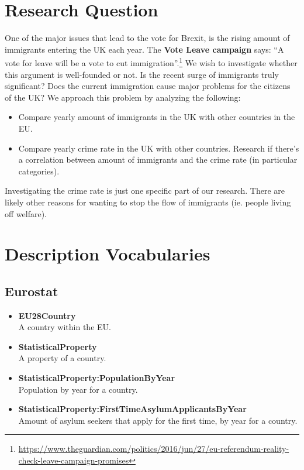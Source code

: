 \documentclass[a4paper,10pt]{article}
\begin{document}
\setlength\parindent{0pt}



\section{Research Question}

One of the major issues that lead to the vote for Brexit, is the rising amount of immigrants entering the UK each year. The \textbf{Vote Leave campaign} says: ``A vote for leave will be a vote to cut immigration''.\footnote{\url{https://www.theguardian.com/politics/2016/jun/27/eu-referendum-reality-check-leave-campaign-promises}} We wish to investigate whether this argument is well-founded or not. Is the recent surge of immigrants truly significant? Does the current immigration cause major problems for the citizens of the UK? We approach this problem by analyzing the following:
\begin{itemize}
	\item Compare yearly amount of immigrants in the UK with other countries in the EU.
	\item Compare yearly crime rate in the UK with other countries. Research if there's a correlation between amount of immigrants and the crime rate (in particular categories).
\end{itemize}

Investigating the crime rate is just one specific part of our research. There are likely other reasons for wanting to stop the flow of immigrants (ie. people living off welfare).

\section{Description Vocabularies}

\subsection{Eurostat}

\begin{itemize}
	\item \textbf{EU28Country}\\
	A country within the EU.
	\item \textbf{StatisticalProperty}\\
	A property of a country.
	\item \textbf{StatisticalProperty:PopulationByYear}\\
	Population by year for a country.
	\item \textbf{StatisticalProperty:FirstTimeAsylumApplicantsByYear}\\
	Amount of asylum seekers that apply for the first time, by year for a country.
\end{itemize}
\end{document}
